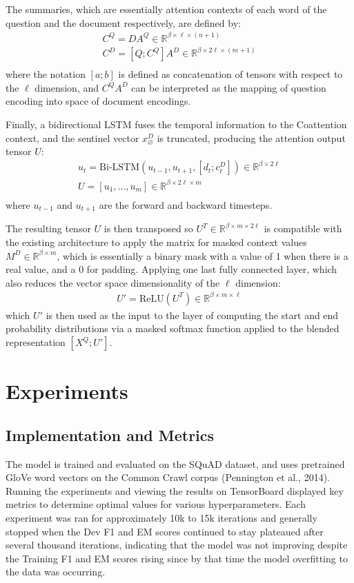 \documentclass{article} %
\begin{document}
The summaries, which are essentially attention contexts of each word of the question
and the document respectively, are defined by:
\begin{align}
  C^Q = DA^Q \in \mathbb{R}^{\beta\times \ell\times (n+1)} \\
  C^D = [Q;C^Q]A^D \in \mathbb{R}^{\beta\times 2\ell\times (m+1)} \\
\end{align}
where the notation $[a;b]$ is defined as concatenation of tensors with respect to the $\ell$ dimension,
and $C^QA^D$ can be interpreted as the mapping of question encoding into space of document encodings.

Finally, a bidirectional LSTM fuses the temporal information
to the Coattention context, and the sentinel vector $x_\varnothing^D$ is
truncated, producing the attention output tensor $U$:
\begin{align}
  u_t = \text{Bi-LSTM}(u_{t-1},u_{t+1},[d_t;c_t^D]) \in \mathbb{R}^{\beta\times 2\ell} \\
  U = [u_1,...,u_m] \in \mathbb{R}^{\beta\times 2\ell\times m} \\
\end{align}
where $u_{t-1}$ and $u_{t+1}$ are the forward and backward timesteps.

The resulting tensor $U$ is then transposed so $U^T \in \mathbb{R}^{\beta\times m \times 2\ell}$
is compatible with the existing architecture to apply the matrix for masked context
values $M^D \in \mathbb{R}^{\beta\times m}$, which is essentially a binary mask with a value of 1
when there is a real value, and a 0 for padding.
Applying one last fully connected layer, which also reduces the vector space dimensionality of the $\ell$ dimension:
\begin{align}
  U' = \text{ReLU}(U^T) \in \mathbb{R}^{\beta\times m \times \ell}
\end{align}
which $U'$ is then used as the input to the layer of computing the start and end probability distributions via
a masked softmax function applied to the blended representation $[X^Q;U']$.


\pagebreak

\section{Experiments}

\subsection{Implementation and Metrics}
The model is trained and evaluated on the SQuAD dataset, and uses
pretrained GloVe word vectors on the Common Crawl corpus (Pennington et al., 2014).
Running the experiments and viewing the results on TensorBoard displayed key metrics
to determine optimal values for various hyperparameters.
Each experiment was ran for approximately 10k to 15k iterations and generally stopped
when the Dev F1 and EM scores continued to stay plateaued after several thousand iterations,
indicating that the model was not improving despite the Training F1 and EM scores rising since by that time
the model overfitting to the data was occurring.
\end{document}
